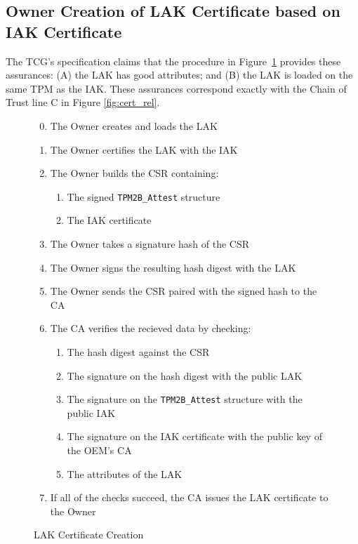 \documentclass[runningheads]{llncs}
\begin{document}
\subsection{Owner Creation of LAK Certificate based on IAK Certificate}

The TCG's specification claims that the procedure in
Figure~\ref{fig:lak-certificate-creation} provides
these assurances: (A) the LAK has good attributes; and (B) the LAK is
loaded on the same TPM as the IAK. These assurances correspond exactly
with the Chain of Trust line C in Figure \ref{fig:cert_rel}.

\begin{figure}[hpbt]
\begin{enumerate}[itemsep=0pt,parsep=0pt,partopsep=0pt]
  \setcounter{enumi}{-1}
  \item The Owner creates and loads the LAK
  \item The Owner certifies the LAK with the IAK
  \item The Owner builds the CSR containing:
  \begin{enumerate}[topsep=0pt, itemsep=0pt,parsep=0pt,partopsep=0pt]
    \item The signed \verb|TPM2B_Attest| structure
    \item The IAK certificate
  \end{enumerate}
  \item The Owner takes a signature hash of the CSR
  \item The Owner signs the resulting hash digest with the LAK
  \item The Owner sends the CSR paired with the signed hash to the CA
  \item The CA verifies the recieved data by checking:
  \begin{enumerate}[topsep=0pt, itemsep=0pt,parsep=0pt,partopsep=0pt]
    \item The hash digest against the CSR
    \item The signature on the hash digest with the public LAK
    \item The signature on the \verb|TPM2B_Attest| structure with the public IAK
    \item The signature on the IAK certificate with the public key of the OEM's CA
    \item The attributes of the LAK
  \end{enumerate}
  \item If all of the checks succeed, the CA issues the LAK certificate to the Owner
  \end{enumerate}
  \caption{LAK Certificate Creation}
  \label{fig:lak-certificate-creation}
\end{figure}
\end{document}
